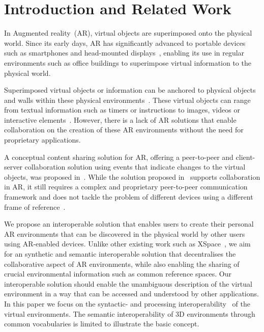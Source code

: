 \section{Introduction and Related Work}
In Augmented reality~(AR), virtual objects are superimposed onto the physical world. Since its early days, AR has significantly advanced to portable devices such as smartphones and head-mounted displays~\cite{10.5555/2427126}, enabling its use in regular environments such as office buildings to superimpose virtual information to the physical world.

Superimposed virtual objects or information can be anchored to physical objects and walls within these physical environments~\cite{10.1145/3301275.3302278,kalaitzakis2021fiducial}. These virtual objects can range from textual information such as timers or instructions to images, videos or interactive elements~\cite{6948506}. However, there is a lack of AR solutions that enable collaboration on the creation of these AR environments without the need for proprietary applications.

A conceptual content sharing solution for AR, offering a peer-to-peer and client-server collaboration solution using events that indicate changes to the virtual objects, was proposed in~\cite{236306}. While the solution proposed in~\cite{236306} supports collaboration in AR, it still requires a complex and proprietary peer-to-peer communication framework and does not tackle the problem of different devices using a different frame of reference~\cite{mou2004frames}. 

We propose an interoperable solution that enables users to create their personal AR environments that can be discovered in the physical world by other users using AR-enabled devices. Unlike other existing work such as XSpace~\cite{10.1145/3567721}, we aim for an synthetic and semantic interoperable solution that decentralises the collaborative aspect of AR environments, while also enabling the sharing of crucial environmental information such as common reference spaces. Our interoperable solution should enable the unambiguous description of the virtual environment in a way that can be accessed and understood by other applications. In this paper we focus on the syntactic- and processing interoperability~\cite{doi:10.1080/13614570109516975,khan2013process} of the virtual environments. The semantic interoperability of 3D environments through common vocabularies is limited to illustrate the basic concept.
